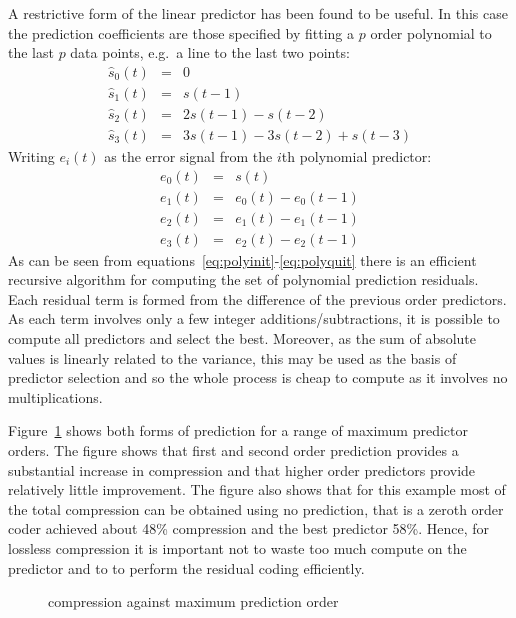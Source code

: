 A restrictive form of the linear predictor has been found to be useful.
In this case the prediction coefficients are those specified by fitting
a $p$ order polynomial to the last $p$ data points, e.g.\ a line to the
last two points:
\begin{eqnarray}
\hat{s}_0(t) & = & 0 \\
\hat{s}_1(t) & = & s(t-1) \\
\hat{s}_2(t) & = & 2 s(t-1) - s(t-2) \\
\hat{s}_3(t) & = & 3 s(t-1) - 3 s(t-2) + s(t-3)
\end{eqnarray}
Writing $e_i(t)$ as the error signal from the $i$th polynomial predictor:
\begin{eqnarray}
e_0(t) & = & s(t) \label{eq:polyinit}\\
e_1(t) & = & e_0(t) - e_0(t - 1) \\
e_2(t) & = & e_1(t) - e_1(t - 1) \\
e_3(t) & = & e_2(t) - e_2(t - 1) \label{eq:polyquit}
\end{eqnarray}
As can be seen from equations~\ref{eq:polyinit}-\ref{eq:polyquit} there
is an efficient recursive algorithm for computing the set of polynomial
prediction residuals.  Each residual term is formed from the difference
of the previous order predictors.  As each term involves only a few
integer additions/subtractions, it is possible to compute all predictors
and select the best.  Moreover, as the sum of absolute values is
linearly related to the variance, this may be used as the basis of
predictor selection and so the whole process is cheap to compute as it
involves no multiplications.

Figure~\ref{fig:rate} shows both forms of prediction for a range of
maximum predictor orders.  The figure shows that first and second order
prediction provides a substantial increase in compression and that
higher order predictors provide relatively little improvement.  The
figure also shows that for this example most of the total compression
can be obtained using no prediction, that is a zeroth order coder
achieved about 48\% compression and the best predictor 58\%.  Hence, for
lossless compression it is important not to waste too much compute on
the predictor and to to perform the residual coding efficiently.
\begin{figure}[hbtp]
\center\mbox{}
\caption[nop]{compression against maximum prediction order}
\label{fig:rate}
\end{figure}

